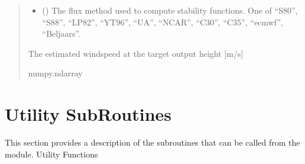 \documentclass[letterpaper,10pt,english]{sphinxmanual}
\begin{document}
\begin{fulllineitems}
\begin{quote}
\begin{description}
\begin{itemize}
\item {}
\sphinxAtStartPar
{} () \textendash{} The flux method used to compute stability functions. One of “S80”, “S88”,
“LP82”, “YT96”, “UA”, “NCAR”, “C30”, “C35”, “ecmwf”, “Beljaars”.

\end{itemize}

\sphinxAtStartPar
The estimated wind\sphinxhyphen{}speed at the target output height {[}m/s{]}

\sphinxAtStartPar
numpy.ndarray

\end{description}\end{quote}

\end{fulllineitems}



\section{Utility Sub\sphinxhyphen{}Routines}
\label{\detokenize{users_guide:utility-sub-routines}}
\sphinxAtStartPar
This section provides a description of the sub\sphinxhyphen{}routines that can be called from the  module.
\label{\detokenize{users_guide:module-AirSeaFluxCode.util_subs}}
\sphinxAtStartPar
Utility Functions
\end{document}
